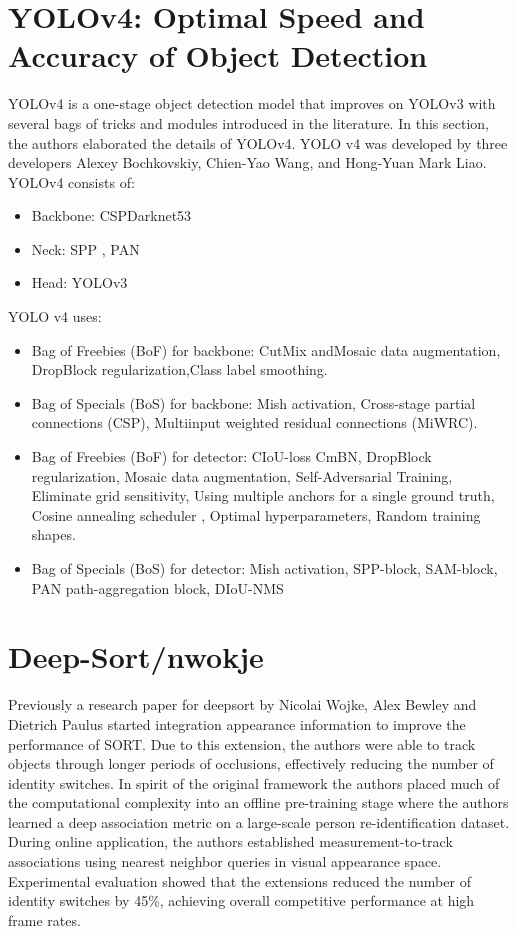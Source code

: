     \section{YOLOv4: Optimal Speed and Accuracy of Object Detection}
        YOLOv4 is a one-stage object detection model that improves on YOLOv3 with several bags of tricks and modules introduced in the literature.\cite{bochkovskiy2020yolov4} In this section, the authors elaborated the details of YOLOv4. YOLO v4 was developed by three developers Alexey Bochkovskiy, Chien-Yao Wang, and Hong-Yuan Mark Liao. YOLOv4 consists of: 
        \begin{itemize}
            \item Backbone: CSPDarknet53
            \item Neck: SPP , PAN
            \item Head: YOLOv3
        \end{itemize}
        YOLO v4 uses:

        \begin{itemize}
            \item Bag of Freebies (BoF) for backbone: CutMix andMosaic data augmentation, DropBlock regularization,Class label smoothing.
            \item Bag of Specials (BoS) for backbone: Mish activation, Cross-stage partial connections (CSP), Multiinput weighted residual connections (MiWRC).
            \item Bag of Freebies (BoF) for detector: CIoU-loss CmBN, DropBlock
            regularization, Mosaic data augmentation, Self-Adversarial Training, Eliminate grid sensitivity, Using multiple anchors for a single ground truth, Cosine annealing scheduler , Optimal hyperparameters, Random training shapes.
            \item Bag of Specials (BoS) for detector: Mish activation, SPP-block,
            SAM-block, PAN path-aggregation block, DIoU-NMS
        \end{itemize}
    \section{Deep-Sort/nwokje} 
        Previously a research paper for deepsort by Nicolai Wojke, Alex Bewley and Dietrich Paulus started integration appearance information to improve the performance of SORT.\cite{wojke2017simple} Due to this extension, the authors were able to track objects through longer periods of occlusions, effectively reducing the number of identity switches. In spirit of the original framework the authors placed much of the computational complexity into an offline pre-training stage where the authors learned a deep association metric on a large-scale person re-identification dataset. During online application, the authors established measurement-to-track associations using nearest neighbor queries in visual appearance space. Experimental evaluation showed that the extensions reduced the number of identity switches by 45\%, achieving overall competitive performance at high frame rates.
